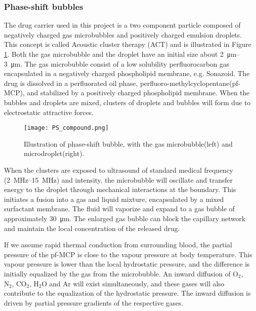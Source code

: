 \subsubsection{Phase-shift bubbles}
The drug carrier used in this project is a two component particle composed of negatively charged gas microbubbles and positively charged emulsion droplets. This concept is called Acoustic cluster therapy (ACT\texttrademark) and is illustrated in Figure \ref{Fig:ACT}. Both the gas microbubble and the droplet have an initial size about \SIrange{2}{3}{\micro\metre}. The gas microbubble consist of a low solubility perfluorocarbon gas encapsulated in a negatively charged phospholipid membrane, e.g. Sonazoid\texttrademark. The drug is dissolved in a perfluorated oil phase, perfluoro-methylcyclopentane(pf-MCP), and stabilized by a positively charged phospholipid membrane. When the bubbles and droplets are mixed, clusters of droplets and bubbles will form due to electrostatic attractive forces.


\begin{figure}[h]
  \centering
  \texttt{[image: PS\_compound.png]}
  \caption{Illustration of phase-shift bubble, with the gas microbubble(left) and microdroplet(right).}
  \label{Fig:ACT}
\end{figure}


When the clusters are exposed to ultrasound of standard medical frequency (\SIrange{2}{15}{\mega\hertz}) and intensity\cite{Hoskins2010}, the microbubble will oscillate and transfer energy to the droplet through mechanical interactions at the boundary. This initiates a fusion into a gas and liquid mixture, encapsulated by a mixed surfactant membrane. The fluid will vaporize and expand to a gas bubble of approximately \SI{30}{\micro\metre}. The enlarged gas bubble can block the capillary network and maintain the local concentration of the released drug.  

If we assume rapid thermal conduction from surrounding blood, the partial pressure of the pf-MCP is close to the vapour pressure at body temperature. This vapour pressure is lower than the local hydrostatic pressure, and the difference is initially equalized by the gas from the microbubble. An inward diffusion of $\mathrm{O}_2$, $\mathrm{N}_2$, $\mathrm{CO}_2$, $\mathrm{H}_2\mathrm{O}$ and $\mathrm{Ar}$ will exist simultaneously, and these gases will also contribute to the equalization of the hydrostatic pressure. The inward diffusion is driven by partial pressure gradients of the respective gases. 

